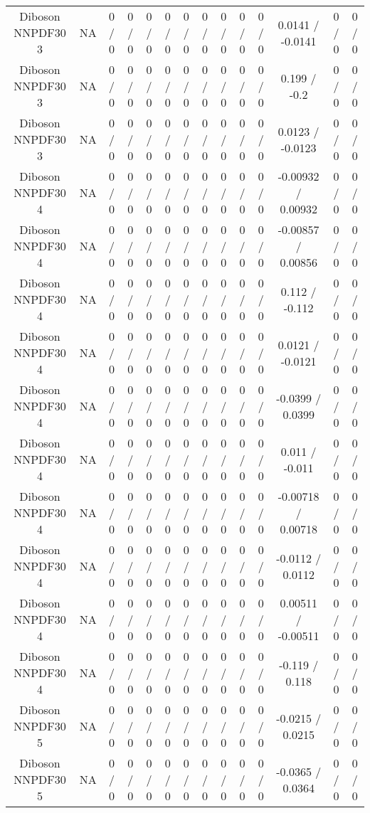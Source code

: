 \documentclass[10pt]{article}
\begin{document}
\begin{table}[htbp]
\begin{center}
\begin{tabular}{|c|c|c|c|c|c|c|c|c|c|c|c|c|c|}
  Diboson NNPDF30 3 &    NA    & 0 / 0 & 0 / 0 & 0 / 0 & 0 / 0 & 0 / 0 & 0 / 0 & 0 / 0 & 0 / 0 & 0 / 0 & 0.0141 / -0.0141 & 0 / 0 & 0 / 0 \\ 
  Diboson NNPDF30 3 &    NA    & 0 / 0 & 0 / 0 & 0 / 0 & 0 / 0 & 0 / 0 & 0 / 0 & 0 / 0 & 0 / 0 & 0 / 0 & 0.199 / -0.2 & 0 / 0 & 0 / 0 \\ 
  Diboson NNPDF30 3 &    NA    & 0 / 0 & 0 / 0 & 0 / 0 & 0 / 0 & 0 / 0 & 0 / 0 & 0 / 0 & 0 / 0 & 0 / 0 & 0.0123 / -0.0123 & 0 / 0 & 0 / 0 \\ 
  Diboson NNPDF30 4 &    NA    & 0 / 0 & 0 / 0 & 0 / 0 & 0 / 0 & 0 / 0 & 0 / 0 & 0 / 0 & 0 / 0 & 0 / 0 & -0.00932 / 0.00932 & 0 / 0 & 0 / 0 \\ 
  Diboson NNPDF30 4 &    NA    & 0 / 0 & 0 / 0 & 0 / 0 & 0 / 0 & 0 / 0 & 0 / 0 & 0 / 0 & 0 / 0 & 0 / 0 & -0.00857 / 0.00856 & 0 / 0 & 0 / 0 \\ 
  Diboson NNPDF30 4 &    NA    & 0 / 0 & 0 / 0 & 0 / 0 & 0 / 0 & 0 / 0 & 0 / 0 & 0 / 0 & 0 / 0 & 0 / 0 & 0.112 / -0.112 & 0 / 0 & 0 / 0 \\ 
  Diboson NNPDF30 4 &    NA    & 0 / 0 & 0 / 0 & 0 / 0 & 0 / 0 & 0 / 0 & 0 / 0 & 0 / 0 & 0 / 0 & 0 / 0 & 0.0121 / -0.0121 & 0 / 0 & 0 / 0 \\ 
  Diboson NNPDF30 4 &    NA    & 0 / 0 & 0 / 0 & 0 / 0 & 0 / 0 & 0 / 0 & 0 / 0 & 0 / 0 & 0 / 0 & 0 / 0 & -0.0399 / 0.0399 & 0 / 0 & 0 / 0 \\ 
  Diboson NNPDF30 4 &    NA    & 0 / 0 & 0 / 0 & 0 / 0 & 0 / 0 & 0 / 0 & 0 / 0 & 0 / 0 & 0 / 0 & 0 / 0 & 0.011 / -0.011 & 0 / 0 & 0 / 0 \\ 
  Diboson NNPDF30 4 &    NA    & 0 / 0 & 0 / 0 & 0 / 0 & 0 / 0 & 0 / 0 & 0 / 0 & 0 / 0 & 0 / 0 & 0 / 0 & -0.00718 / 0.00718 & 0 / 0 & 0 / 0 \\ 
  Diboson NNPDF30 4 &    NA    & 0 / 0 & 0 / 0 & 0 / 0 & 0 / 0 & 0 / 0 & 0 / 0 & 0 / 0 & 0 / 0 & 0 / 0 & -0.0112 / 0.0112 & 0 / 0 & 0 / 0 \\ 
  Diboson NNPDF30 4 &    NA    & 0 / 0 & 0 / 0 & 0 / 0 & 0 / 0 & 0 / 0 & 0 / 0 & 0 / 0 & 0 / 0 & 0 / 0 & 0.00511 / -0.00511 & 0 / 0 & 0 / 0 \\ 
  Diboson NNPDF30 4 &    NA    & 0 / 0 & 0 / 0 & 0 / 0 & 0 / 0 & 0 / 0 & 0 / 0 & 0 / 0 & 0 / 0 & 0 / 0 & -0.119 / 0.118 & 0 / 0 & 0 / 0 \\ 
  Diboson NNPDF30 5 &    NA    & 0 / 0 & 0 / 0 & 0 / 0 & 0 / 0 & 0 / 0 & 0 / 0 & 0 / 0 & 0 / 0 & 0 / 0 & -0.0215 / 0.0215 & 0 / 0 & 0 / 0 \\ 
  Diboson NNPDF30 5 &    NA    & 0 / 0 & 0 / 0 & 0 / 0 & 0 / 0 & 0 / 0 & 0 / 0 & 0 / 0 & 0 / 0 & 0 / 0 & -0.0365 / 0.0364 & 0 / 0 & 0 / 0 \\ 

\end{tabular}
\end{center}
\end{table}
\end{document}
